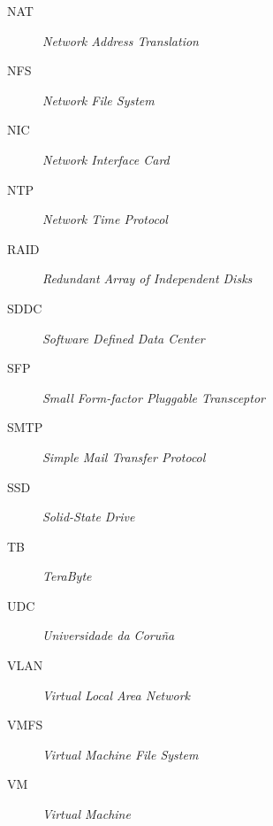 \begin{description}
 \item [NAT] \emph{Network Address Translation}
 \item [NFS] \emph{Network File System}
 \item [NIC] \emph{Network Interface Card}
 \item [NTP] \emph{Network Time Protocol}
 \item [RAID] \emph{Redundant Array of Independent Disks}
 \item [SDDC] \emph{Software Defined Data Center}
 \item [SFP] \emph{Small Form-factor Pluggable Transceptor}
 \item [SMTP] \emph{Simple Mail Transfer Protocol}
 \item [SSD] \emph{Solid-State Drive}
 \item [TB] \emph{TeraByte}
 \item [UDC] \emph{Universidade da Coruña}
 \item [VLAN] \emph{Virtual Local Area Network}
 \item [VMFS] \emph{Virtual Machine File System}
 \item [VM] \emph{Virtual Machine}

\end{description}
